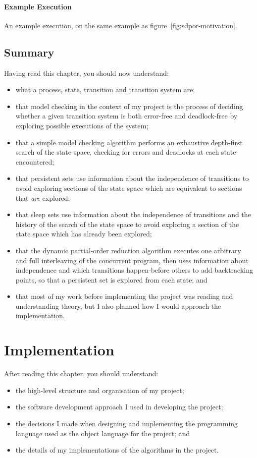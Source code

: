 \documentclass[12pt,a4paper,twoside,openright]{report}
\newenvironment{understandinglist}
	{\begin{itemize} \itemsep 0em}{\end{itemize}}
\begin{document}
\subsubsection{Example Execution}
An example execution, on the same example as
figure~\ref{fig:sdpor-motivation}.

\section{Summary}
Having read this chapter,
you should now understand:
\begin{understandinglist}
	\item what a process, state, transition
	and transition system are;
	\item that model checking in the
	context of my project is the process
	of deciding whether a given transition
	system is both error-free and deadlock-free
	by exploring possible executions of the
	system;
	\item that a simple model checking algorithm
	performs an exhaustive depth-first search
	of the state space, checking for errors and
	deadlocks at each state encountered;
	\item that persistent sets use information
	about the independence of transitions to
	avoid exploring sections of the state space
	which are equivalent to sections that \emph{are}
	explored;
	\item that sleep sets use information about
	the independence of transitions and the history
	of the search of the state space to avoid
	exploring a section of the state space which
	has already been explored;
	\item that the dynamic partial-order
	reduction algorithm executes one arbitrary
	and full interleaving of the concurrent program,
	then uses information about independence and
	which transitions happen-before others to
	add backtracking points, so that a
	persistent set is explored from each state; and
	\item that most of my work before implementing
	the project was reading and understanding theory,
	but I also planned how I would approach the
	implementation.
\end{understandinglist}

\chapter{Implementation}
After reading this chapter,
you should understand:
\begin{understandinglist}
	\item the high-level structure and
	organisation of my project;
	\item the software development approach
	I used in developing the project;
	\item the decisions I made
	when designing and implementing
	the programming language used
	as the object language for the
	project; and
	\item the details of my
	implementations of the
	algorithms in the project.
\end{understandinglist}
\end{document}
